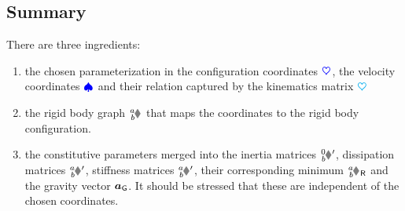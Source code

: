 \subsection{Summary}
There are three ingredients:
\begin{enumerate}
 \item the chosen parameterization in the configuration coordinates $\boldsymbol{\textcolor{blue}{\heartsuit}}$, the velocity coordinates $\boldsymbol{\textcolor{blue}{\spadesuit}}$ and their relation captured by the kinematics matrix $\boldsymbol{\textcolor{cyan}{\heartsuit}}$
 \item the rigid body graph $\bodyHomoCoord{\BidxI}{\BidxII}$ that maps the coordinates to the rigid body configuration.
 \item the constitutive parameters merged into the inertia matrices $\bodyInertiaMatp{0}{\BidxII}$, dissipation matrices $\bodyDissMatp{\BidxI}{\BidxII}$, stiffness matrices $\bodyStiffMatp{\BidxI}{\BidxII}$, their corresponding minimum $\bodyHomoCoordR{\BidxI}{\BidxII}$ and the gravity vector $\boldsymbol{a}_{\mathsf{G}}$.
 It should be stressed that these are independent of the chosen coordinates.
\end{enumerate}

